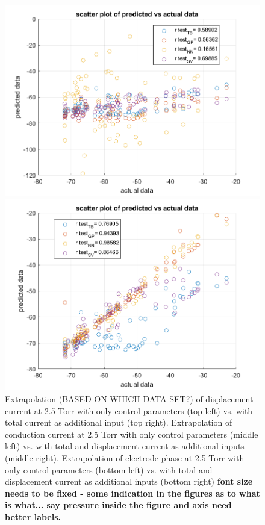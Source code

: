 \documentclass[12pt]{iopart}
\begin{document}
\begin{figure}[ht!]
\begin{center}
    \begin{minipage}{0.495\textwidth}
        \includegraphics[width=1\textwidth]{new figures/phase_wCP2500.png}
    \end{minipage}
    \begin{minipage}{0.495\textwidth}
        \includegraphics[width=1\textwidth]{new figures/phase_2500.png}
    \end{minipage}
    \caption{Extrapolation (BASED ON WHICH DATA SET?) of displacement current at 2.5 Torr with only control parameters (top left) vs. with total current as additional input (top right). Extrapolation of conduction current at 2.5 Torr with only control parameters (middle left) vs. with total and displacement current as additional inputs (middle right). Extrapolation of electrode phase at 2.5 Torr with only control parameters (bottom left) vs. with total and displacement current as additional inputs (bottom right) \textbf{font size needs to be fixed - some indication in the figures as to what is what... say pressure inside the figure and axis need better labels.}} 
\label{Fig:gap_SV,pressure_TB,species_TB}
\end{center}
\end{figure}
\end{document}
